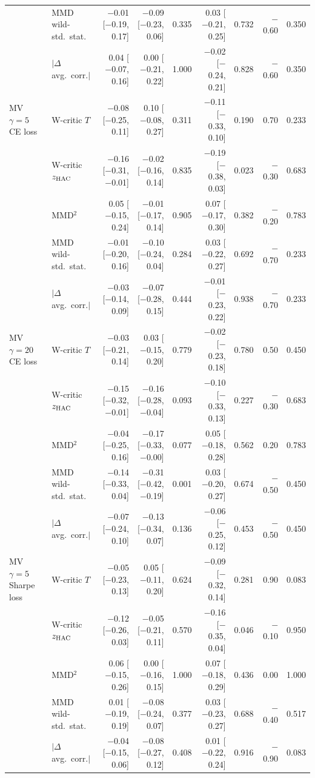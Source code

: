 \begin{tabular}{llrrrrrrr}
 & MMD wild-std.\ stat. & $-$0.01 [$-$0.19, 0.17] & $-$0.09 [$-$0.23, 0.06] & 0.335 & 0.03 [$-$0.21, 0.25] & 0.732 & $-$0.60 & 0.350 \\
 & $|\Delta$ avg.\ corr.$|$ & 0.04 [$-$0.07, 0.16] & 0.00 [$-$0.21, 0.22] & 1.000 & $-$0.02 [$-$0.24, 0.21] & 0.828 & $-$0.60 & 0.350 \\
MV $\gamma=5$ CE loss & W-critic $T$ & $-$0.08 [$-$0.25, 0.11] & 0.10 [$-$0.08, 0.27] & 0.311 & $-$0.11 [$-$0.33, 0.10] & 0.190 & 0.70 & 0.233 \\
 & W-critic $z_{\rm HAC}$ & $-$0.16 [$-$0.31, $-$0.01] & $-$0.02 [$-$0.16, 0.14] & 0.835 & $-$0.19 [$-$0.38, 0.03] & 0.023 & $-$0.30 & 0.683 \\
 & MMD$^2$ & 0.05 [$-$0.15, 0.24] & $-$0.01 [$-$0.17, 0.14] & 0.905 & 0.07 [$-$0.17, 0.30] & 0.382 & $-$0.20 & 0.783 \\
 & MMD wild-std.\ stat. & $-$0.01 [$-$0.20, 0.16] & $-$0.10 [$-$0.24, 0.04] & 0.284 & 0.03 [$-$0.22, 0.27] & 0.692 & $-$0.70 & 0.233 \\
 & $|\Delta$ avg.\ corr.$|$ & $-$0.03 [$-$0.14, 0.09] & $-$0.07 [$-$0.28, 0.15] & 0.444 & $-$0.01 [$-$0.23, 0.22] & 0.938 & $-$0.70 & 0.233 \\
MV $\gamma=20$ CE loss & W-critic $T$ & $-$0.03 [$-$0.21, 0.14] & 0.03 [$-$0.15, 0.20] & 0.779 & $-$0.02 [$-$0.23, 0.18] & 0.780 & 0.50 & 0.450 \\
 & W-critic $z_{\rm HAC}$ & $-$0.15 [$-$0.32, $-$0.01] & $-$0.16 [$-$0.28, $-$0.04] & 0.093 & $-$0.10 [$-$0.33, 0.13] & 0.227 & $-$0.30 & 0.683 \\
 & MMD$^2$ & $-$0.04 [$-$0.25, 0.16] & $-$0.17 [$-$0.33, $-$0.00] & 0.077 & 0.05 [$-$0.18, 0.28] & 0.562 & 0.20 & 0.783 \\
 & MMD wild-std.\ stat. & $-$0.14 [$-$0.33, 0.04] & $-$0.31 [$-$0.42, $-$0.19] & 0.001 & 0.03 [$-$0.20, 0.27] & 0.674 & $-$0.50 & 0.450 \\
 & $|\Delta$ avg.\ corr.$|$ & $-$0.07 [$-$0.24, 0.10] & $-$0.13 [$-$0.34, 0.07] & 0.136 & $-$0.06 [$-$0.25, 0.12] & 0.453 & $-$0.50 & 0.450 \\
MV $\gamma=5$ Sharpe loss & W-critic $T$ & $-$0.05 [$-$0.23, 0.13] & 0.05 [$-$0.11, 0.20] & 0.624 & $-$0.09 [$-$0.32, 0.14] & 0.281 & 0.90 & 0.083 \\
 & W-critic $z_{\rm HAC}$ & $-$0.12 [$-$0.26, 0.03] & $-$0.05 [$-$0.21, 0.11] & 0.570 & $-$0.16 [$-$0.35, 0.04] & 0.046 & $-$0.10 & 0.950 \\
 & MMD$^2$ & 0.06 [$-$0.15, 0.26] & 0.00 [$-$0.16, 0.15] & 1.000 & 0.07 [$-$0.18, 0.29] & 0.436 & 0.00 & 1.000 \\
 & MMD wild-std.\ stat. & 0.01 [$-$0.19, 0.19] & $-$0.08 [$-$0.24, 0.07] & 0.377 & 0.03 [$-$0.23, 0.27] & 0.688 & $-$0.40 & 0.517 \\
 & $|\Delta$ avg.\ corr.$|$ & $-$0.04 [$-$0.15, 0.06] & $-$0.08 [$-$0.27, 0.12] & 0.408 & 0.01 [$-$0.22, 0.24] & 0.916 & $-$0.90 & 0.083 \\
\bottomrule
\end{tabular}
